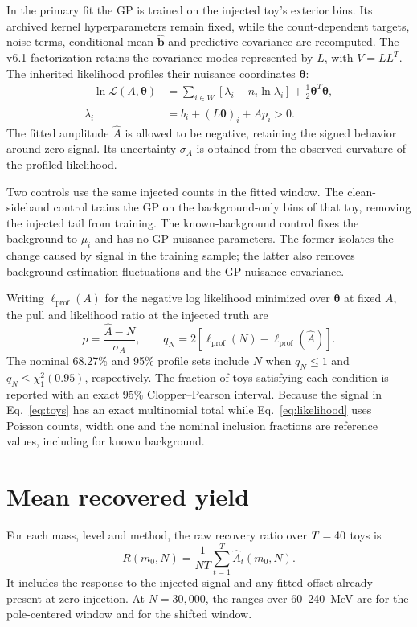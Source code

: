 \documentclass[11pt]{article}
\begin{document}
In the primary fit the GP is trained on the injected toy's exterior
bins. Its archived kernel hyperparameters remain fixed, while the
count-dependent targets, noise terms, conditional mean $\widehat{\bm b}$
and predictive covariance are recomputed. The v6.1 factorization retains
the covariance modes represented by $L$, with $V=LL^T$. The inherited
likelihood profiles their nuisance coordinates $\bm\theta$:
\begin{equation}
 \begin{aligned}
 -\ln\mathcal{L}(A,\bm\theta)&=
 \sum_{i\in W}\left[\lambda_i-n_i\ln\lambda_i\right]
 +\frac12\bm\theta^T\bm\theta,\\
 \lambda_i&=\widehat b_i+(L\bm\theta)_i+A p_i>0.
 \end{aligned}
 \label{eq:likelihood}
\end{equation}
The fitted amplitude $\widehat A$ is allowed to be negative, retaining
the signed behavior around zero signal. Its uncertainty $\sigma_A$ is
obtained from the observed curvature of the profiled likelihood.

Two controls use the same injected counts in the fitted window.
The clean-sideband control trains the GP on the background-only bins
of that toy, removing the injected tail from training. The
known-background control fixes the background to $\mu_i$ and has no GP
nuisance parameters.
The former isolates the change caused by signal in the training sample;
the latter also removes background-estimation fluctuations and the GP
nuisance covariance.

Writing $\ell_{\mathrm{prof}}(A)$ for the negative log likelihood minimized
over $\bm\theta$ at fixed $A$, the pull and likelihood ratio at the
injected truth are
\begin{equation}
 p=\frac{\widehat A-N}{\sigma_A},\qquad
 q_N=2\left[\ell_{\mathrm{prof}}(N)-
                  \ell_{\mathrm{prof}}(\widehat A)\right].
 \label{eq:pull}
\end{equation}
The nominal 68.27\% and 95\% profile sets include $N$ when $q_N\leq1$
and $q_N\leq\chi^2_1(0.95)$, respectively. The fraction of toys satisfying
each condition is reported with an exact 95\% Clopper--Pearson interval.
Because the signal in
Eq.~\eqref{eq:toys} has an exact multinomial total while
Eq.~\eqref{eq:likelihood} uses Poisson counts, width one and the nominal
inclusion fractions are reference values, including for known background.

\clearpage
\section{Mean recovered yield}
For each mass, level and method, the raw recovery ratio over
$T=40$ toys is
\begin{equation}
 R(m_0,N)=\frac{1}{NT}
              \sum_{t=1}^{T}\widehat A_t(m_0,N).
\end{equation}
It includes the response to the injected signal and any fitted offset
already present at zero injection. At $N=30{,}000$, the ranges over
60--240~MeV are \RawPoleRange{} for the pole-centered window and
\RawCoreRange{} for the shifted window.
\end{document}
